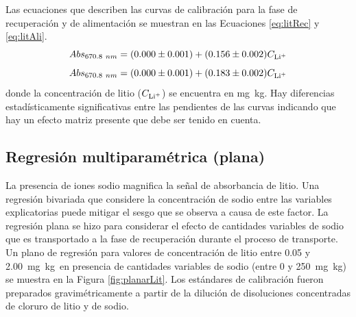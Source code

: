\clearpage Las ecuaciones que describen las curvas de calibración para la fase de recuperación y de alimentación se muestran en las Ecuaciones \ref{eq:litRec} y \ref{eq:litAli}.
\begin{equation}\label{eq:litRec}
    Abs_{670.8~nm}=(0.000\pm0.001)+(0.156\pm0.002) C_{\ce{Li^+}}
\end{equation}
\begin{equation}\label{eq:litAli}
    Abs_{670.8~nm}=(0.000\pm0.001)+(0.183\pm0.002) C_{\ce{Li^+}}
\end{equation}
donde la concentración de litio ($C_{\ce{Li^+}}$) se encuentra en mg~kg\mnn. Hay diferencias estadísticamente significativas entre las pendientes de las curvas indicando que hay un efecto matriz presente que debe ser tenido en cuenta.


\subsection{Regresión multiparamétrica (plana)}\label{sec:planar1}
La presencia de iones sodio magnifica la señal de absorbancia de litio. Una regresión bivariada que considere la concentración de sodio entre las variables explicatorias puede mitigar el sesgo que se observa a causa de este factor. La regresión plana se hizo para considerar el efecto de cantidades variables de sodio que es transportado a la fase de recuperación durante el proceso de transporte. Un plano de regresión para valores de concentración de litio entre 0.05 y 2.00~mg~kg\mnn\ en presencia de cantidades variables de sodio (entre 0 y 250~mg~kg\mnn) se muestra en la Figura \ref{fig:planarLit}. Los estándares de calibración fueron preparados gravimétricamente a partir de la dilución de disoluciones concentradas de cloruro de litio y de sodio.

